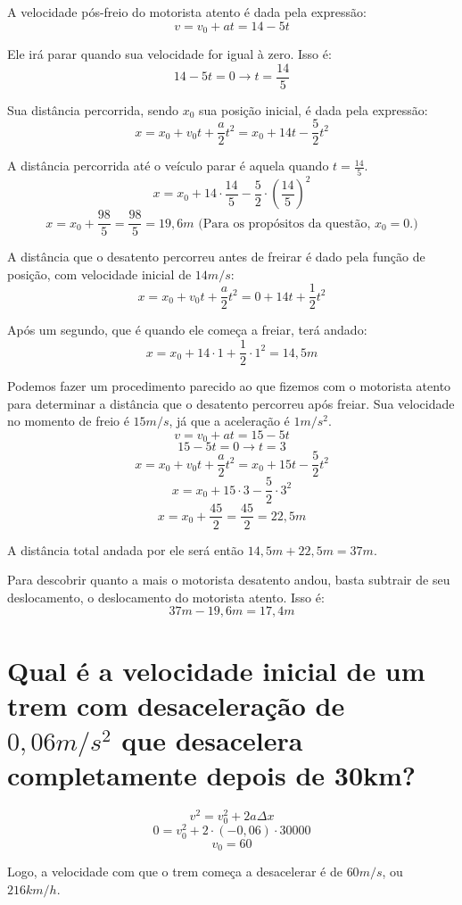\documentclass{article}
\begin{document}
    \par A velocidade pós-freio do motorista atento é dada pela expressão:
    \[v=v_0+at=14-5t\]
    \par Ele irá parar quando sua velocidade for igual à zero. Isso é:
    \[14-5t=0 \rightarrow t=\frac{14}{5}\]
    \par Sua distância percorrida, sendo \(x_0\) sua posição inicial, é dada pela expressão:
    \[x=x_0+v_0t+\frac{a}{2}t^2=x_0+14t-\frac{5}{2}t^2\]
    \par A distância percorrida até o veículo parar é aquela quando \(t=\frac{14}{5}\).
    \[x=x_0+14\cdot\frac{14}{5}-\frac{5}{2}\cdot(\frac{14}{5})^2\]
    \[x=x_0+\frac{98}{5}=\frac{98}{5}=19,6m \textrm{   (Para os propósitos da questão, \(x_0 = 0\).)}\]
    \par A distância que o desatento percorreu antes de freirar é dado pela função de posição, com velocidade inicial de \(14m/s\):
    \[x = x_0 + v_0t +\frac{a}{2}t^2 = 0 + 14t + \frac{1}{2}t^2\]
    \par Após um segundo, que é quando ele começa a freiar, terá andado:
    \[x = x_0 + 14\cdot 1 + \frac{1}{2} \cdot 1^2 = 14,5m\]
    \par Podemos fazer um procedimento parecido ao que fizemos com o motorista atento para determinar a distância que o desatento percorreu após freiar. Sua velocidade no momento de freio é \(15m/s\), já que a aceleração é \(1m/s^2\).
    \[v=v_0+at=15-5t\]
    \[15-5t=0 \rightarrow t=3\]
    \[x=x_0+v_0t+\frac{a}{2}t^2=x_0+15t-\frac{5}{2}t^2\]
    \[x=x_0+15\cdot3-\frac{5}{2}\cdot3^2\]
    \[x=x_0+\frac{45}{2}=\frac{45}{2}=22,5m\]
    \par A distância total andada por ele será então \(14,5m + 22,5m = 37m\). 
    \par Para descobrir quanto a mais o motorista desatento andou, basta subtrair de seu deslocamento, o deslocamento do motorista atento. Isso é:
    \[37m - 19,6m = 17,4m\]

\section{Qual é a velocidade inicial de um trem com desaceleração de \(0,06m/s^2\) que desacelera completamente depois de 30km?}
    \[v^2=v_0^2+2a\Delta x\]
    \[0=v_0^2+2\cdot (-0,06)\cdot 30000\]
    \[v_0=60\]
    \par Logo, a velocidade com que o trem começa a desacelerar é de \(60m/s\), ou \(216km/h\).
\end{document}
